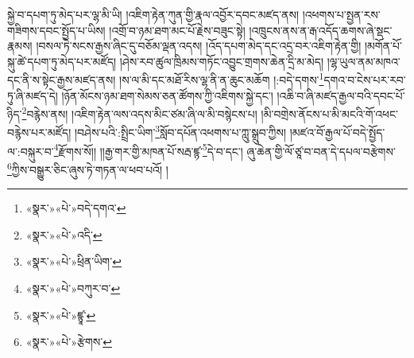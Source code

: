 སྐྱེ་བ་དཔག་ཏུ་མེད་པར་ལྷ་མི་ཡི། །འཇིག་རྟེན་ཀུན་གྱི་རྣལ་འབྱོར་དབང་མཛད་ནས། །འཕགས་པ་སྤྱན་རས་གཟིགས་དབང་སྤྱོད་པ་ཡིས། །འགྲོ་བ་ཉམ་ཐག་མང་པོ་རྗེས་བཟུང་སྟེ། །འཁྲུངས་ནས་ན་རྒ་འདོད་ཆགས་ཞེ་སྡང་རྣམས། །བསལ་ཏེ་སངས་རྒྱས་ཞིང་དུ་བཅོམ་ལྡན་འདས། །འོད་དཔག་མེད་དང་འདྲ་བར་འཇིག་རྟེན་གྱི། །མགོན་པོ་སྐུ་ཚེ་དཔག་ཏུ་མེད་པར་མཛོད། །ཤེས་རབ་ཚུལ་ཁྲིམས་གཏོང་འབྱུང་གྲགས་ཆེན་དྲི་མ་མེད། །ལྷ་ཡུལ་ནམ་མཁའ་དང་ནི་ས་སྟེང་རྒྱས་མཛད་ནས། །ས་ལ་མི་དང་མཐོ་རིས་ལྷ་ནི་ན་ཆུང་མཆོག །:བདེ་དགས་\footnote{«སྣར་»«པེ་»བདེ་དགའ་}དགའ་བ་ངེས་པར་རབ་ཏུ་ཞི་མཛད་དེ། །ཉོན་མོངས་ཉམ་ཐག་སེམས་ཅན་ཚོགས་ཀྱི་འཇིགས་སྐྱེ་དང་། །འཆི་བ་ཞི་མཛད་རྒྱལ་བའི་དབང་པོ་ཉིད་\footnote{«སྣར་»«པེ་»འདི་}བརྙེས་ནས། །འཇིག་རྟེན་ལས་འདས་མིང་ཙམ་ཞི་ལ་མི་བསྙེངས་པ། །མི་བགྲེས་ནོངས་པ་མི་མངའི་གོ་འཕང་བརྙེས་པར་མཛོད། །བཤེས་པའི་:སྤྲིང་ཡིག་\footnote{«སྣར་»«པེ་»ཕྲིན་ཡིག་}སློབ་དཔོན་འཕགས་པ་ཀླུ་སྒྲུབ་ཀྱིས། །མཛའ་བོ་རྒྱལ་པོ་བདེ་སྤྱོད་ལ་:བསྐུར་བ་\footnote{«སྣར་»«པེ་»བཀུར་བ་}རྫོགས་སོ།། །།རྒྱ་གར་གྱི་མཁན་པོ་སརྦ་ཛྙ་\footnote{«སྣར་»«པེ་»ཛྙཱ་}དེ་བ་དང་། ཞུ་ཆེན་གྱི་ལོ་ཙཱ་བ་བན་དེ་དཔལ་བརྩེགས་\footnote{«སྣར་»«པེ་»རྩེགས་}ཀྱིས་བསྒྱུར་ཅིང་ཞུས་ཏེ་གཏན་ལ་ཕབ་པའོ། ། 